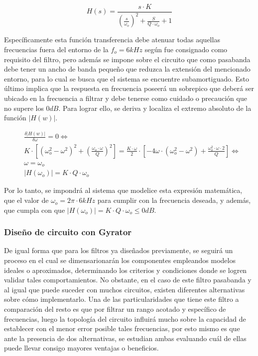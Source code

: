 \begin{equation}
    H(s) = \frac{s \cdot K}{\left( \frac{s}{\omega_o} \right)^{2} + \frac{S}{Q \cdot \omega_o} + 1}    
    \label{eq:funcion_pasabanda}
\end{equation}

Espec\'ificamente esta funci\'on transferencia debe atenuar todas aquellas frecuencias fuera del entorno de la $f_o = 6kHz$ seg\'un fue consignado como requisito del filtro, pero adem\'as se impone sobre el circuito
que como pasabanda debe tener un ancho de banda peque\~no que reduzca la extensi\'on del mencionado entorno, para lo cual se busca que el sistema se encuentre subamortiguado. Esto \'ultimo implica que la respuesta en frecuencia poseer\'a
un sobrepico que deber\'a ser ubicado en la frecuencia a filtrar y debe tenerse como cuidado o precauci\'on que no supere los $0dB$. Para lograr ello, se deriva y localiza el extremo absoluto de la funci\'on $|H(w)|$.

\begin{align*}
    & \frac{\delta |H(w)|}{\delta \omega} = 0 \Leftrightarrow \\
    & K \cdot \left[ (\omega_o^{2} - \omega^{2})^{2} + (\frac{\omega_o \cdot \omega}{Q})^{2} \right]
    = \frac{K \cdot \omega}{2} \cdot \left[ -4 \omega \cdot ( \omega_o^{2} - \omega^{2}) + \frac{\omega_o^{2} \cdot \omega \cdot 2}{Q} \right] \Leftrightarrow \\
    & \omega = \omega_o \\
    & |H(\omega_o)| = K \cdot Q \cdot \omega_o
\end{align*}

Por lo tanto, se impondr\'a al sistema que modelice esta expresi\'on matem\'atica, que el valor de $\omega_o = 2\pi \cdot 6kHz$ para cumplir con la frecuencia deseada, y adem\'as,
que cumpla con que $|H(\omega_o)| = K \cdot Q \cdot \omega_o \leq 0dB$.

\subsubsection{Dise\~no de circuito con Gyrator}
De igual forma que para los filtros ya dise\~nados previamente, se seguir\'a un proceso en el cual se dimensarionar\'an los componentes empleandos modelos ideales o aproximados,
determinando los criterios y condiciones donde se logren validar tales comportamientos. No obstante, en el caso de este filtro pasabanda y al igual que puede suceder con muchos circuitos,
existen diferentes alternativas sobre c\'omo implementarlo. Una de las particularidades que tiene este filtro a comparaci\'on del resto es que por filtrar un rango acotado y espec\'ifico de frecuencias,
luego la topolog\'ia del circuito influir\'a mucho sobre la capacidad de establecer con el menor error posible tales frecuencias, por esto mismo es que ante la presencia de dos alternativas, se estudian ambas
evaluando cu\'al de ellas puede llevar consigo mayores ventajas o beneficios.

